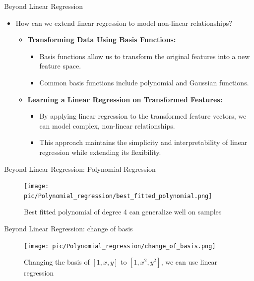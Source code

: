 \documentclass[serif, aspectratio=169]{beamer}
\begin{document}
\begin{frame}{Beyond Linear Regression}
    \begin{itemize}
        \item How can we extend linear regression to model non-linear relationships?
        \begin{itemize}
            \item \textbf{Transforming Data Using Basis Functions:}
            \begin{itemize}
                \item Basis functions allow us to transform the original features into a new feature space.
                \item Common basis functions include polynomial and Gaussian functions.
            \end{itemize}
            \item \textbf{Learning a Linear Regression on Transformed Features:}
            \begin{itemize}
                \item By applying linear regression to the transformed feature vectors, we can model complex, non-linear relationships.
                \item This approach maintains the simplicity and interpretability of linear regression while extending its flexibility.
            \end{itemize}
        \end{itemize}
    \end{itemize}
\end{frame}

\begin{frame}{Beyond Linear Regression: Polynomial Regression}
    \begin{figure}[h]
        \centering
        \texttt{[image: pic/Polynomial\_regression/best\_fitted\_polynomial.png]}
        \caption{Best fitted polynomial of degree 4 can generalize well on samples}
    \end{figure}
\end{frame}


\begin{frame}{Beyond Linear Regression: change of basis}
    \begin{figure}[h]
    \centering
    \texttt{[image: pic/Polynomial\_regression/change\_of\_basis.png]}
    \caption{Changing the basis of \( [1, x, y] \) to \( [1, x^2, y^2] \), we can use linear regression}
    \end{figure}
\end{frame}
\end{document}
